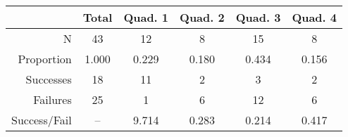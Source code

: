 \begin{tabular}{r|ccccc}
\toprule
             & Total & Quad. 1 & Quad. 2 & Quad. 3 & Quad. 4 \\ \hline
           N &    43 &      12 &       8 &      15 &       8 \\
  Proportion & 1.000 &   0.229 &   0.180 &   0.434 &   0.156 \\
   Successes &    18 &      11 &       2 &       3 &       2 \\
    Failures &    25 &       1 &       6 &      12 &       6 \\
Success/Fail &    -- &   9.714 &   0.283 &   0.214 &   0.417 \\
\bottomrule
\end{tabular}